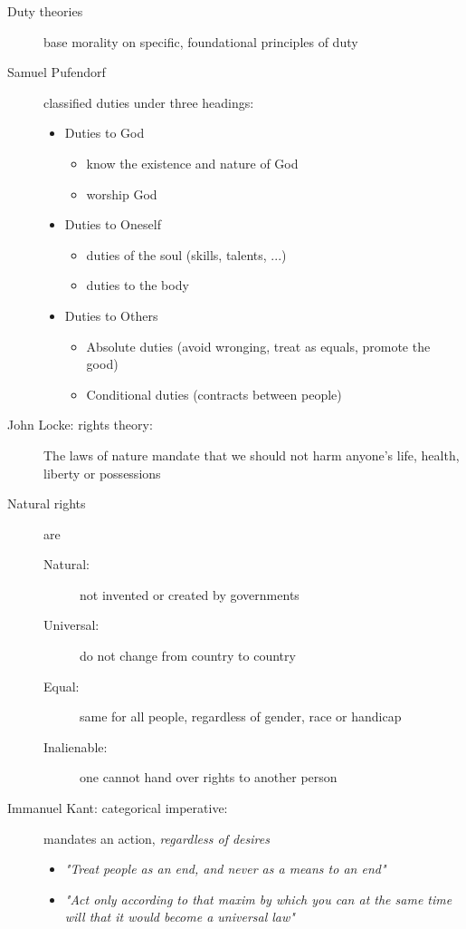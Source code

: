 \documentclass[a4paper]{article}
\begin{document}
\begin{description}
\item[Duty theories] base morality on specific, foundational principles of duty
\item[Samuel Pufendorf] classified duties under three headings:
\begin{itemize}
\item Duties to God
\begin{itemize}
\item know the existence and nature of God
\item worship God
\end{itemize}
\item Duties to Oneself
\begin{itemize}
\item duties of the soul (skills, talents, ...)
\item duties to the body
\end{itemize}
\item Duties to Others
\begin{itemize}
\item Absolute duties (avoid wronging, treat as equals, promote the good)
\item Conditional duties (contracts between people)
\end{itemize}
\end{itemize}
\item[John Locke: rights theory:] The laws of nature mandate that we should not harm anyone's life, health, liberty or possessions
\item[Natural rights] are
\begin{description}
\item[Natural:] not invented or created by governments
\item[Universal:] do not change from country to country
\item[Equal:] same for all people, regardless of gender, race or handicap
\item[Inalienable:] one cannot hand over rights to another person
\end{description}
\item[Immanuel Kant: categorical imperative:] mandates an action, \textit{regardless of desires}
\begin{itemize}
\item \textit{"Treat people as an end, and never as a means to an end"}
\item \textit{"Act only according to that maxim by which you can at the same time will that it would become a universal law"}
\end{itemize}
\end{description}
\end{document}
